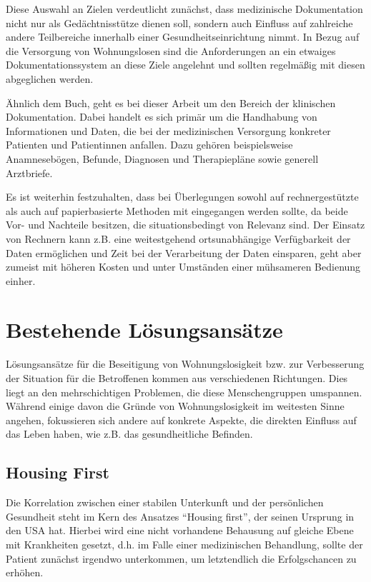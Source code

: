 Diese Auswahl an Zielen verdeutlicht zunächst, dass medizinische Dokumentation nicht nur als Gedächtnisstütze dienen soll, sondern auch Einfluss auf zahlreiche andere Teilbereiche innerhalb einer Gesundheitseinrichtung nimmt. In Bezug auf die Versorgung von Wohnungslosen sind die Anforderungen an ein etwaiges Dokumentationssystem an diese Ziele angelehnt und sollten regelmäßig mit diesen abgeglichen werden.

Ähnlich dem Buch, geht es bei dieser Arbeit um den Bereich der klinischen Dokumentation. Dabei handelt es sich primär um die Handhabung von Informationen und Daten, die bei der medizinischen Versorgung konkreter Patienten und Patientinnen anfallen. Dazu gehören beispielsweise Anamnesebögen, Befunde, Diagnosen und Therapiepläne sowie generell Arztbriefe.

Es ist weiterhin festzuhalten, dass bei Überlegungen sowohl auf rechnergestützte als auch auf papierbasierte Methoden mit eingegangen werden sollte, da beide Vor- und Nachteile besitzen, die situationsbedingt von Relevanz sind. Der Einsatz von Rechnern kann z.B. eine weitestgehend ortsunabhängige Verfügbarkeit der Daten ermöglichen und Zeit bei der Verarbeitung der Daten einsparen, geht aber zumeist mit höheren Kosten und unter Umständen einer mühsameren Bedienung einher.


\section{Bestehende Lösungsansätze}\label{sec:approaches}

Lösungsansätze für die Beseitigung von Wohnungslosigkeit bzw. zur Verbesserung der Situation für die Betroffenen kommen aus verschiedenen Richtungen. Dies liegt an den mehrschichtigen Problemen, die diese Menschengruppen umspannen. Während einige davon die Gründe von Wohnungslosigkeit im weitesten Sinne angehen, fokussieren sich andere auf konkrete Aspekte, die direkten Einfluss auf das Leben haben, wie z.B. das gesundheitliche Befinden.

\subsection{Housing First}

Die Korrelation zwischen einer stabilen Unterkunft und der persönlichen Gesundheit steht im Kern des Ansatzes \enquote{Housing first}, der seinen Ursprung in den USA hat. Hierbei wird eine nicht vorhandene Behausung auf gleiche Ebene mit Krankheiten gesetzt, d.h. im Falle einer medizinischen Behandlung, sollte der Patient zunächst irgendwo unterkommen, um letztendlich die Erfolgschancen zu erhöhen. 

